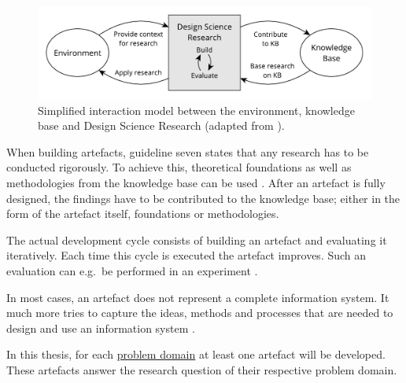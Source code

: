 \begin{figure}[H]
\begin{center}
  \includegraphics[scale=0.7]{images/figures/design_science_cycles.pdf}
\end{center}
\caption[Simplified interaction model between the environment, knowledge base and Design Science Research.]{Simplified interaction model between the environment, knowledge base and Design Science Research (adapted from \autocite[Fig. 1]{HevnerThreeCycleView2007}).}
\label{fig:design_science_cycles}
\end{figure}

When building artefacts, guideline seven states that any research has to be
conducted rigorously. To achieve this, theoretical foundations as well as
methodologies from the knowledge base can be used \autocite[p.
88]{VonAlanDesignscienceinformation2004}. After an artefact is fully designed,
the findings have to be contributed to the knowledge base; either in the form
of the artefact itself, foundations or methodologies.

The actual development cycle consists of building an artefact and evaluating it
iteratively. Each time this cycle is executed the artefact improves. Such an
evaluation can e.g.\ be performed in an experiment \autocite[p.
91]{HevnerThreeCycleView2007}.

In most cases, an artefact does not represent a complete information system. It
much more tries to capture the ideas, methods and processes that are needed to
design and use an information system \autocite[p.
83]{VonAlanDesignscienceinformation2004}.

In this thesis, for each \href{link:problem_domains}{problem domain} at least
one artefact will be developed. These artefacts answer the research question of
their respective problem domain. 

